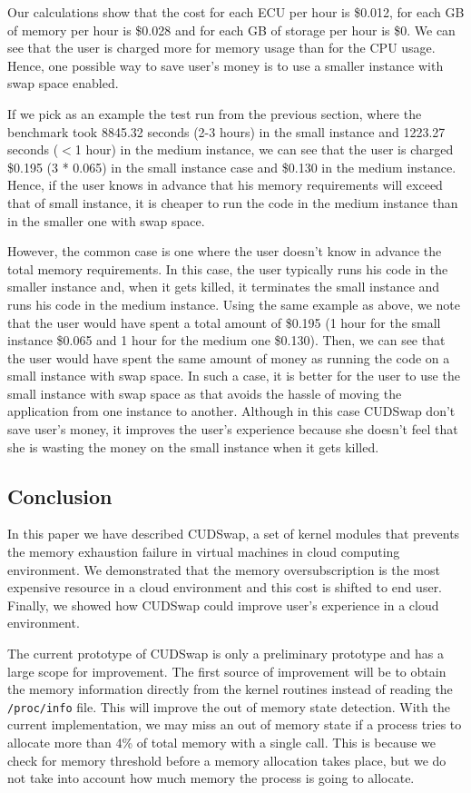 Our calculations show that the cost for each ECU per hour is \$0.012, for each
GB of memory per hour is \$0.028 and for each GB of storage per hour is \$0. We
can see that the user is charged more for memory usage than for the CPU usage.
Hence, one possible way to save user’s money is to use a smaller instance with swap
space enabled.

If we pick as an example the test run from the previous section, where the benchmark
took 8845.32 seconds (2-3 hours) in the small instance and 1223.27 seconds ($<$1 hour)
in the medium instance, we can see that the user is charged \$0.195 (3 * 0.065) in the
small instance case and \$0.130 in the medium instance. Hence, if the user knows in
advance that his memory requirements will exceed that of small instance, it is cheaper to
run the code in the medium instance than in the smaller one with swap space.

However, the common case is one where the user doesn’t know in advance the total
memory requirements. In this case, the user typically runs his code in the smaller
instance and, when it gets killed, it terminates the small instance and runs his
code in the medium instance. Using the same example as above, we note that the user
would have spent a total amount of \$0.195 (1 hour for the small instance \$0.065 and 1 hour
for the medium one \$0.130). Then, we can see that the user would have spent the
same amount of money as running the code on a small instance with swap space. In
such a case, it is better for the user to use the small instance with swap space as
that avoids the hassle of moving the application from one instance to another.
Although in this case CUDSwap don’t save user’s money, it improves the user’s
experience because she doesn’t feel that she is wasting the money on the small
instance when it gets killed.

\subsection{Conclusion}\label{subme_conclusio}

In this paper we have described CUDSwap, a set of kernel modules that prevents the memory
exhaustion failure in virtual machines in cloud computing environment. We demonstrated
that the memory oversubscription is the most expensive resource in a cloud environment
and this cost is shifted to end user. Finally, we showed how CUDSwap could improve user’s
experience in a cloud environment.

The current prototype of CUDSwap is only a preliminary prototype and has a large scope
for improvement. The first source of improvement will be to obtain the memory
information directly from the kernel routines instead of reading the \texttt{/proc/info}
file. This will improve the out of memory state detection. With the current
implementation, we may miss an out of memory state if a process tries to allocate
more than 4\% of total memory with a single call. This is because we check for
memory threshold before a memory allocation takes place, but we do not take into
account how much memory the process is going to allocate.

